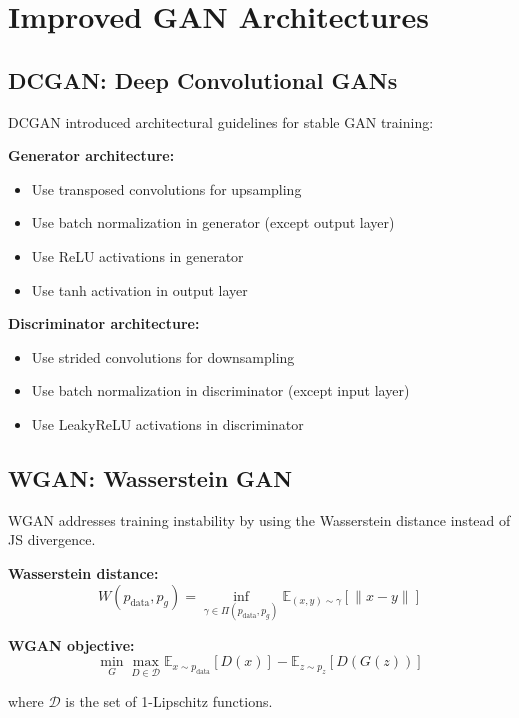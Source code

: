 \section{Improved GAN Architectures}

\subsection{DCGAN: Deep Convolutional GANs}

DCGAN introduced architectural guidelines for stable GAN training:

\textbf{Generator architecture:}
\begin{itemize}
    \item Use transposed convolutions for upsampling
    \item Use batch normalization in generator (except output layer)
    \item Use ReLU activations in generator
    \item Use tanh activation in output layer
\end{itemize}

\textbf{Discriminator architecture:}
\begin{itemize}
    \item Use strided convolutions for downsampling
    \item Use batch normalization in discriminator (except input layer)
    \item Use LeakyReLU activations in discriminator
\end{itemize}

\subsection{WGAN: Wasserstein GAN}

WGAN addresses training instability by using the Wasserstein distance instead of JS divergence.

\textbf{Wasserstein distance:}
\begin{equation}
    W(p_{\text{data}}, p_g) = \inf_{\gamma \in \Pi(p_{\text{data}}, p_g)} \mathbb{E}_{(x,y) \sim \gamma}[\|x - y\|]
\end{equation}

\textbf{WGAN objective:}
\begin{equation}
    \min_G \max_{D \in \mathcal{D}} \mathbb{E}_{x \sim p_{\text{data}}}[D(x)] - \mathbb{E}_{z \sim p_z}[D(G(z))]
\end{equation}

where $\mathcal{D}$ is the set of 1-Lipschitz functions.

